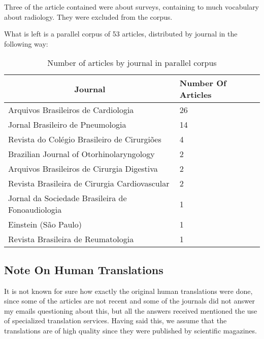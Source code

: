 Three of the article contained were about surveys, containing to much vocabulary about radiology. They were excluded from the corpus.

What is left is a parallel corpus of 53 articles, distributed by journal in the following way:

\begin{table}[ht]
\centering
\caption{Number of articles by journal in parallel corpus}
\label{table:articles_by_journal}
\begin{tabular}{@{}ll@{}}
\toprule
\multicolumn{1}{c}{\textbf{Journal}}                 & \textbf{Number Of Articles} \\ \midrule
Arquivos Brasileiros de Cardiologia         & 26                          \\
Jornal Brasileiro de Pneumologia            & 14                          \\
Revista do Colégio Brasileiro de Cirurgiões & 4                           \\
Brazilian Journal of Otorhinolaryngology    & 2                           \\
Arquivos Brasileiros de Cirurgia Digestiva  & 2                           \\
Revista Brasileira de Cirurgia Cardiovascular        & 2                           \\
Jornal da Sociedade Brasileira de Fonoaudiologia     & 1                           \\
Einstein (São Paulo)                                 & 1                           \\
Revista Brasileira de Reumatologia                   & 1                           \\ \bottomrule
\end{tabular}
\end{table}

\subsection{Note On Human Translations}

It is not known for sure how exactly the original human translations were done, since some of the articles are not recent and some of the journals did not answer my emails questioning about this, but all the answers received mentioned the use of specialized translation services. Having said this, we assume that the translations are of high quality since they were published by scientific magazines. 

